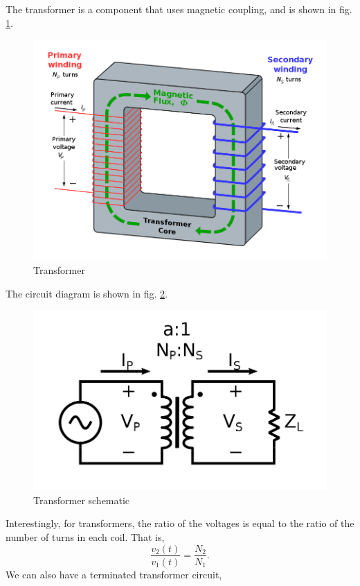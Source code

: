 \documentclass[nobib]{tufte-handout}
\begin{document}
The transformer is a component that uses magnetic coupling,
and is shown in fig. \ref{fig:transformer}. 
\begin{figure}
    \center 
    \caption{Transformer}
    \label{fig:transformer}
    \includegraphics[width=\textwidth/2]{images/Transformer3d_col3.svg.png}
\end{figure}
The circuit diagram is shown in fig. \ref{fig:transschem}. 
\begin{figure}
    \center 
    \caption{Transformer schematic}
    \label{fig:transschem}
    \includegraphics[width=\textwidth/2]{images/Ideal_transformer.svg.png}
\end{figure}
Interestingly, for transformers, the ratio of the voltages 
is equal to the ratio of the number of turns in each 
coil. That is, 
\[\frac{v_2(t)}{v_1(t)} = \frac{N_2}{N_1}.\]
We can also have a terminated transformer circuit, 
\end{document}
